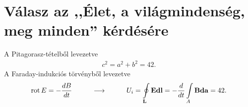 \clearpage\section{Válasz az ,,Élet, a világmindenség, meg minden'' kérdésére}
A Pitagorasz-tételből levezetve
\begin{align}
c^2=a^2+b^2=42.
\end{align}
A Faraday-indukciós törvényből levezetve
\begin{align}
\operatorname{rot} E=-\frac{dB}{dt}\hspace{1cm}\longrightarrow \hspace{1cm}
U_i=\oint\limits_\mathbf{L}{\mathbf{E}\mathbf{dl}}=-\frac{d}{dt}\int\limits_A{\mathbf{B}\mathbf{da}}=42.
\end{align}
